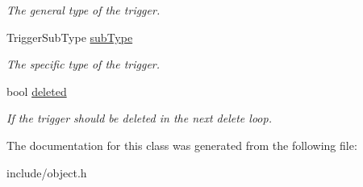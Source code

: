 \begin{DoxyCompactItemize}
\begin{DoxyCompactList}\small\item\em \-The general type of the trigger. \end{DoxyCompactList}\item 
\hypertarget{classTrigger_aa199492b473603cce1bbc6b129e3c7d7}{
\-Trigger\-Sub\-Type \hyperlink{classTrigger_aa199492b473603cce1bbc6b129e3c7d7}{sub\-Type}}
\label{d7/d1d/classTrigger_aa199492b473603cce1bbc6b129e3c7d7}

\begin{DoxyCompactList}\small\item\em \-The specific type of the trigger. \end{DoxyCompactList}\item 
\hypertarget{classTrigger_a1ebf191e8aaaaaff7e14150cbcd3ac29}{
bool \hyperlink{classTrigger_a1ebf191e8aaaaaff7e14150cbcd3ac29}{deleted}}
\label{d7/d1d/classTrigger_a1ebf191e8aaaaaff7e14150cbcd3ac29}

\begin{DoxyCompactList}\small\item\em \-If the trigger should be deleted in the next delete loop. \end{DoxyCompactList}\end{DoxyCompactItemize}


\-The documentation for this class was generated from the following file\-:\begin{DoxyCompactItemize}
\item 
include/object.\-h\end{DoxyCompactItemize}
